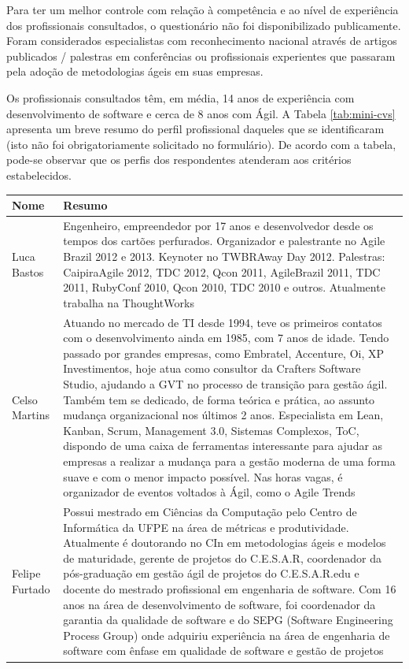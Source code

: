 Para ter um melhor controle com relação à competência e ao nível de experiência dos profissionais consultados, o questionário não foi disponibilizado publicamente. Foram considerados especialistas com reconhecimento nacional através de artigos publicados / palestras em conferências ou profissionais experientes que passaram pela adoção de metodologias ágeis em suas empresas.

Os profissionais consultados têm, em média, 14 anos de experiência com desenvolvimento de software e cerca de 8 anos com Ágil. A Tabela \ref{tab:mini-cvs} apresenta um breve resumo do  perfil profissional daqueles que se identificaram (isto não foi obrigatoriamente solicitado no formulário). De acordo com a tabela, pode-se observar que os perfis dos respondentes atenderam aos critérios estabelecidos.

\begin{tabularx}{\linewidth}{ | p{4cm} | X | } \hline \textbf{Nome} & \textbf{Resumo} \\ \hline
	Luca Bastos & Engenheiro, empreendedor por 17 anos e desenvolvedor desde os tempos dos cartões perfurados. Organizador e palestrante no Agile Brazil 2012 e 2013. Keynoter no TWBRAway Day 2012. Palestras: CaipiraAgile 2012, TDC 2012, Qcon 2011, AgileBrazil 2011, TDC 2011, RubyConf 2010, Qcon 2010, TDC 2010 e outros. Atualmente trabalha na ThoughtWorks \\ \hline
	Celso Martins & Atuando no mercado de TI desde 1994, teve os primeiros contatos com o desenvolvimento ainda em 1985, com 7 anos de idade. Tendo passado por grandes empresas, como Embratel, Accenture, Oi, XP Investimentos, hoje atua como consultor da Crafters Software Studio, ajudando a GVT no processo de transição para gestão ágil. Também tem se dedicado, de forma teórica e prática, ao assunto mudança organizacional nos últimos 2 anos. Especialista em Lean, Kanban, Scrum, Management 3.0, Sistemas Complexos, ToC, dispondo de uma caixa de ferramentas interessante para ajudar as empresas a realizar a mudança para a gestão moderna de uma forma suave e com o menor impacto possível. Nas horas vagas, é organizador de eventos voltados à Ágil, como o Agile Trends \\ \hline
	Felipe Furtado & Possui mestrado em Ciências da Computação pelo Centro de Informática da UFPE na área de métricas e produtividade. Atualmente é doutorando no CIn em metodologias ágeis e modelos de maturidade, gerente de projetos do C.E.S.A.R, coordenador da pós-graduação em gestão ágil de projetos do C.E.S.A.R.edu e docente do mestrado profissional em engenharia de software. Com 16 anos na área de desenvolvimento de software, foi coordenador da garantia da qualidade de software e do SEPG (Software Engineering Process Group) onde adquiriu experiência na área de engenharia de software com ênfase em qualidade de software e gestão de projetos \\ \hline

\end{tabularx}
